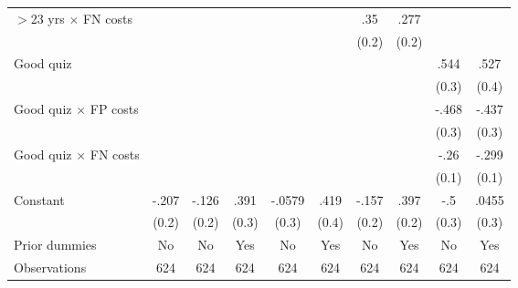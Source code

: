 \begin{table}[htbp]
\begin{tabular}{l*{9}{c}}
$>$23 yrs $\times$ FN costs&                  &                  &                  &                  &                  &      .35         &     .277         &                  &                  \\
                &                  &                  &                  &                  &                  &    (0.2)         &    (0.2)         &                  &                  \\
Good quiz       &                  &                  &                  &                  &                  &                  &                  &     .544\sym{*}  &     .527         \\
                &                  &                  &                  &                  &                  &                  &                  &    (0.3)         &    (0.4)         \\
Good quiz $\times$ FP costs&                  &                  &                  &                  &                  &                  &                  &    -.468\sym{*}  &    -.437\sym{*}  \\
                &                  &                  &                  &                  &                  &                  &                  &    (0.3)         &    (0.3)         \\
Good quiz $\times$ FN costs&                  &                  &                  &                  &                  &                  &                  &     -.26\sym{*}  &    -.299\sym{**} \\
                &                  &                  &                  &                  &                  &                  &                  &    (0.1)         &    (0.1)         \\
Constant        &    -.207         &    -.126         &     .391         &   -.0579         &     .419         &    -.157         &     .397\sym{*}  &      -.5\sym{**} &    .0455         \\
                &    (0.2)         &    (0.2)         &    (0.3)         &    (0.3)         &    (0.4)         &    (0.2)         &    (0.2)         &    (0.3)         &    (0.3)         \\
Prior dummies   &       No         &       No         &      Yes         &       No         &      Yes         &       No         &      Yes         &       No         &      Yes         \\
\hline
Observations    &      624         &      624         &      624         &      624         &      624         &      624         &      624         &      624         &      624         \\

\end{tabular}
\end{table}
